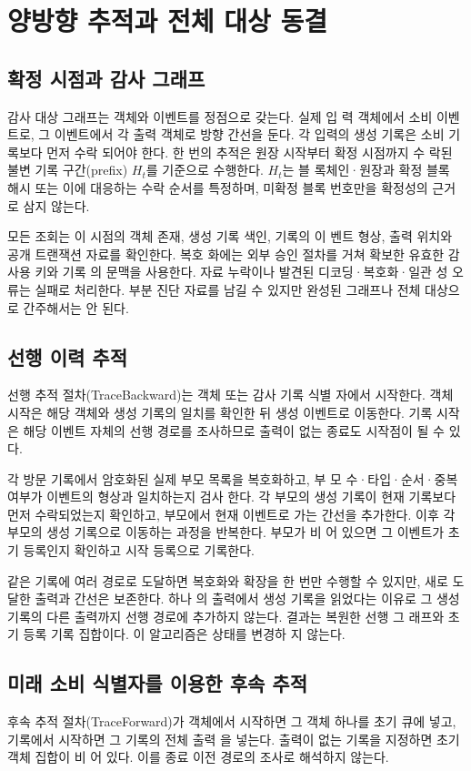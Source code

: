 \section{양방향 추적과 전체 대상 동결}

\subsection{확정 시점과 감사 그래프}
감사 대상 그래프는 객체와 이벤트를 정점으로 갖는다. 실제 입
력 객체에서 소비 이벤트로, 그 이벤트에서 각 출력 객체로 방향
간선을 둔다. 각 입력의 생성 기록은 소비 기록보다 먼저 수락
되어야 한다. 한 번의 추적은 원장 시작부터 확정 시점까지 수
락된 불변 기록 구간(prefix) \(H_{t}\)를 기준으로 수행한다. \(H_{t}\)는 블
록체인·원장과 확정 블록 해시 또는 이에 대응하는 수락 순서를
특정하며, 미확정 블록 번호만을 확정성의 근거로 삼지 않는다.

모든 조회는 이 시점의 객체 존재, 생성 기록 색인, 기록의 이
벤트 형상, 출력 위치와 공개 트랜잭션 자료를 확인한다. 복호
화에는 외부 승인 절차를 거쳐 확보한 유효한 감사용 키와 기록
의 문맥을 사용한다. 자료 누락이나 발견된 디코딩·복호화·일관
성 오류는 실패로 처리한다. 부분 진단 자료를 남길 수 있지만
완성된 그래프나 전체 대상으로 간주해서는 안 된다.

\subsection{선행 이력 추적}
선행 추적 절차(TraceBackward)는 객체 또는 감사 기록 식별
자에서 시작한다. 객체 시작은 해당 객체와 생성 기록의 일치를
확인한 뒤 생성 이벤트로 이동한다. 기록 시작은 해당 이벤트
자체의 선행 경로를 조사하므로 출력이 없는 종료도 시작점이
될 수 있다.

각 방문 기록에서 암호화된 실제 부모 목록을 복호화하고, 부
모 수·타입·순서·중복 여부가 이벤트의 형상과 일치하는지 검사
한다. 각 부모의 생성 기록이 현재 기록보다 먼저 수락되었는지
확인하고, 부모에서 현재 이벤트로 가는 간선을 추가한다. 이후
각 부모의 생성 기록으로 이동하는 과정을 반복한다. 부모가 비
어 있으면 그 이벤트가 초기 등록인지 확인하고 시작 등록으로
기록한다.

같은 기록에 여러 경로로 도달하면 복호화와 확장을 한 번만
수행할 수 있지만, 새로 도달한 출력과 간선은 보존한다. 하나
의 출력에서 생성 기록을 읽었다는 이유로 그 생성 기록의 다른
출력까지 선행 경로에 추가하지 않는다. 결과는 복원한 선행 그
래프와 초기 등록 기록 집합이다. 이 알고리즘은 상태를 변경하
지 않는다.

\subsection{미래 소비 식별자를 이용한 후속 추적}
후속 추적 절차(TraceForward)가 객체에서 시작하면 그 객체
하나를 초기 큐에 넣고, 기록에서 시작하면 그 기록의 전체 출력
을 넣는다. 출력이 없는 기록을 지정하면 초기 객체 집합이 비
어 있다. 이를 종료 이전 경로의 조사로 해석하지 않는다.


